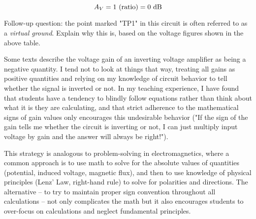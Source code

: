 $$A_V = 1 \hbox{ (ratio)} = 0 \hbox{ dB}$$

\vskip 10pt

Follow-up question: the point marked "TP1" in this circuit is often referred to as a {\it virtual ground}.  Explain why this is, based on the voltage figures shown in the above table.







Some texts describe the voltage gain of an inverting voltage amplifier as being a negative quantity.  I tend not to look at things that way, treating all gains as positive quantities and relying on my knowledge of circuit behavior to tell whether the signal is inverted or not.  In my teaching experience, I have found that students have a tendency to blindly follow equations rather than think about what it is they are calculating, and that strict adherence to the mathematical signs of gain values only encourages this undesirable behavior ("If the sign of the gain tells me whether the circuit is inverting or not, I can just multiply input voltage by gain and the answer will always be right!").

This strategy is analogous to problem-solving in electromagnetics, where a common approach is to use math to solve for the absolute values of quantities (potential, induced voltage, magnetic flux), and then to use knowledge of physical principles (Lenz' Law, right-hand rule) to solve for polarities and directions.  The alternative -- to try to maintain proper sign convention throughout all calculations -- not only complicates the math but it also encourages students to over-focus on calculations and neglect fundamental principles.




